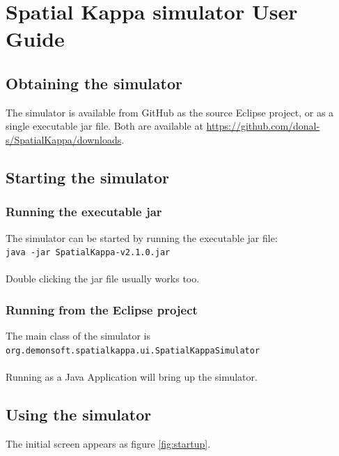\chapter{Spatial Kappa simulator User Guide}

\section{Obtaining the simulator}

The simulator is available from GitHub as the source Eclipse project, or as a single executable jar file. Both are available at \url{https://github.com/donal-s/SpatialKappa/downloads}. 

\section{Starting the simulator}

\subsection{Running the executable jar}

The simulator can be started by running the executable jar file:\\
\verb|java -jar SpatialKappa-v2.1.0.jar|\\\\
Double clicking the jar file usually works too.

\subsection{Running from the Eclipse project}

The main class of the simulator is \\
\verb|org.demonsoft.spatialkappa.ui.SpatialKappaSimulator|\\\\
Running as a Java Application will bring up the simulator.


\section{Using the simulator}

The initial screen appears as figure \ref{fig:startup}.

